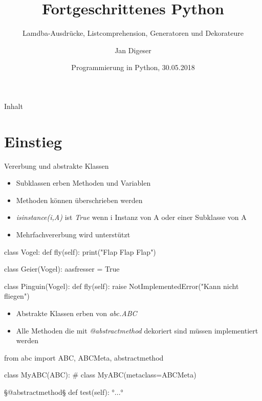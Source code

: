 \documentclass[ngerman]{beamer}
\title{Fortgeschrittenes Python}
\subtitle{Lamdba-Ausdrücke, Listcomprehension, Generatoren und Dekorateure}
\author{Jan Digeser}
\date{Programmierung in Python, 30.05.2018}
\theoremstyle{definition}
\begin{document}
\begin{frame}
  \titlepage
\end{frame}

\begin{frame}{Inhalt}
  \tableofcontents
\end{frame}
\section{Einstieg}
\begin{frame}{Vererbung und abstrakte Klassen}
	\begin{itemize}
		\item {Subklassen erben Methoden und Variablen}
		\item {Methoden können überschrieben werden}
		\item {\emph{isinstance(i,A)} ist \emph{True} wenn i Instanz von A oder
		einer Subklasse von A}
		\item {Mehrfachvererbung wird unterstützt}
	\end{itemize}
	\framebreak
	\begin{example}[Vererbung]
		\begin{python}
class Vogel:
	def fly(self):
		print("Flap Flap Flap")
		
class Geier(Vogel):
	aasfresser = True
	
class Pinguin(Vogel):
	def fly(self):
		raise NotImplementedError("Kann nicht fliegen")

		\end{python}		
	\end{example}

	\framebreak
	
	\begin{itemize}
		\item {Abstrakte Klassen erben von \emph{abc.ABC}}
		\item {Alle Methoden die mit \emph{@abstractmethod} dekoriert sind müssen implementiert werden}
	\end{itemize}
	\begin{example}
		\begin{python}
from abc import ABC, ABCMeta, abstractmethod

class MyABC(ABC): # class MyABC(metaclass=ABCMeta)
	
	§@abstractmethod§
	def test(self): °...°
	
		\end{python}		
	\end{example}
\end{frame}
\end{document}
